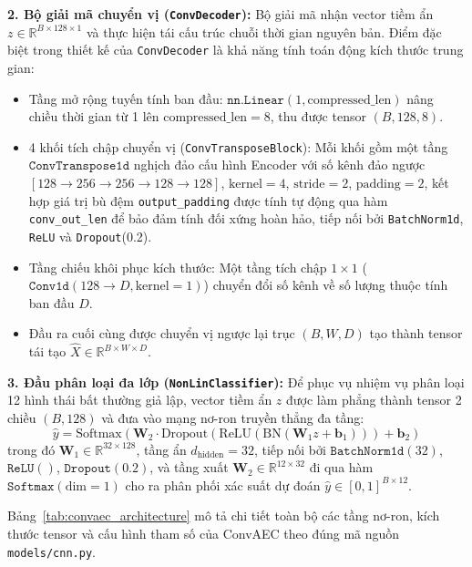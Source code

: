 \documentclass[sigconf,nonacm]{acmart}
\begin{document}
\textbf{2. Bộ giải mã chuyển vị (\texttt{ConvDecoder}):}
Bộ giải mã nhận vector tiềm ẩn $z \in \mathbb{R}^{B \times 128 \times 1}$ và thực hiện tái cấu trúc chuỗi thời gian nguyên bản. Điểm đặc biệt trong thiết kế của \texttt{ConvDecoder} là khả năng tính toán động kích thước trung gian:
\begin{itemize}[leftmargin=*, itemsep=1pt, parsep=0pt]
    \item Tầng mở rộng tuyến tính ban đầu: $\texttt{nn.Linear}(1, \text{compressed\_len})$ nâng chiều thời gian từ 1 lên $\text{compressed\_len} = 8$, thu được tensor $(B, 128, 8)$.
    \item 4 khối tích chập chuyển vị (\texttt{ConvTransposeBlock}): Mỗi khối gồm một tầng $\texttt{ConvTranspose1d}$ nghịch đảo cấu hình Encoder với số kênh đảo ngược $[128 \rightarrow 256 \rightarrow 256 \rightarrow 128 \rightarrow 128]$, $\text{kernel}=4$, $\text{stride}=2$, $\text{padding}=2$, kết hợp giá trị bù đệm \texttt{output\_padding} được tính tự động qua hàm \texttt{conv\_out\_len} để bảo đảm tính đối xứng hoàn hảo, tiếp nối bởi \texttt{BatchNorm1d}, \texttt{ReLU} và \texttt{Dropout}(0.2).
    \item Tầng chiếu khôi phục kích thước: Một tầng tích chập $1 \times 1$ ($\texttt{Conv1d}(128 \rightarrow D, \text{kernel}=1)$) chuyển đổi số kênh về số lượng thuộc tính ban đầu $D$.
    \item Đầu ra cuối cùng được chuyển vị ngược lại trục $(B, W, D)$ tạo thành tensor tái tạo $\hat{X} \in \mathbb{R}^{B \times W \times D}$.
\end{itemize}

\textbf{3. Đầu phân loại đa lớp (\texttt{NonLinClassifier}):}
Để phục vụ nhiệm vụ phân loại 12 hình thái bất thường giả lập, vector tiềm ẩn $z$ được làm phẳng thành tensor 2 chiều $(B, 128)$ và đưa vào mạng nơ-ron truyền thẳng đa tầng:
\begin{equation}
    \hat{y} = \text{Softmax}\left(\mathbf{W}_2 \cdot \text{Dropout}\left(\text{ReLU}\left(\text{BN}\left(\mathbf{W}_1 z + \mathbf{b}_1\right)\right)\right) + \mathbf{b}_2\right)
\end{equation}
trong đó $\mathbf{W}_1 \in \mathbb{R}^{32 \times 128}$, tầng ẩn $d_{\text{hidden}} = 32$, tiếp nối bởi $\texttt{BatchNorm1d}(32)$, $\texttt{ReLU}()$, $\texttt{Dropout}(0.2)$, và tầng xuất $\mathbf{W}_2 \in \mathbb{R}^{12 \times 32}$ đi qua hàm $\texttt{Softmax}(\text{dim}=1)$ cho ra phân phối xác suất dự đoán $\hat{y} \in [0, 1]^{B \times 12}$.

Bảng~\ref{tab:convaec_architecture} mô tả chi tiết toàn bộ các tầng nơ-ron, kích thước tensor và cấu hình tham số của ConvAEC theo đúng mã nguồn \texttt{models/cnn.py}.
\end{document}
